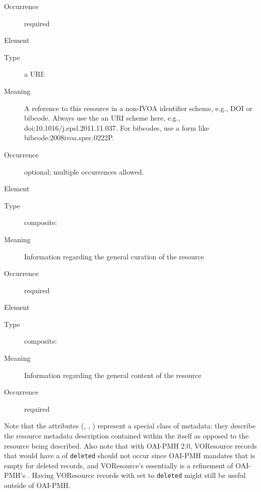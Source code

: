 \documentclass[11pt,a4paper]{ivoa}
\begin{document}
\begin{generated}
\begin{bigdescription}
\begin{description}
\item[Occurrence] required


\end{description}
\item[Element \xmlel{altIdentifier}]
\begin{description}
\item[Type] a URI: 
\item[Meaning] 
                  A reference to this resource in a non-IVOA identifier
                  scheme, e.g., DOI or bibcode.  Always use the an URI scheme
                  here, e.g., doi:10.1016/j.epsl.2011.11.037.  For bibcodes,
                  use a form like bibcode:2008ivoa.spec.0222P.
               
\item[Occurrence] optional; multiple occurrences allowed.

\end{description}
\item[Element \xmlel{curation}]
\begin{description}
\item[Type] composite: 
\item[Meaning] 
               Information regarding the general curation of the resource
             
\item[Occurrence] required

\end{description}
\item[Element \xmlel{content}]
\begin{description}
\item[Type] composite: 
\item[Meaning] 
               Information regarding the general content of the resource
             
\item[Occurrence] required

\end{description}


\end{bigdescription}\endgroup

\endgroup
\end{generated}


Note that the  attributes (,
, ) represent a special class of
metadata: they describe the resource metadata description contained
within the  itself as opposed to the resource being
described.  Also note that with OAI-PMH 2.0, VOResource records that
would have a  of \verb|deleted| should not occur since
OAI-PMH mandates that  is empty for deleted
records, and VOResource's  essentially is a refinement of
OAI-PMH's .  Having VOResource records with 
set to \verb|deleted| might still be useful outside of OAI-PMH.
\end{document}
